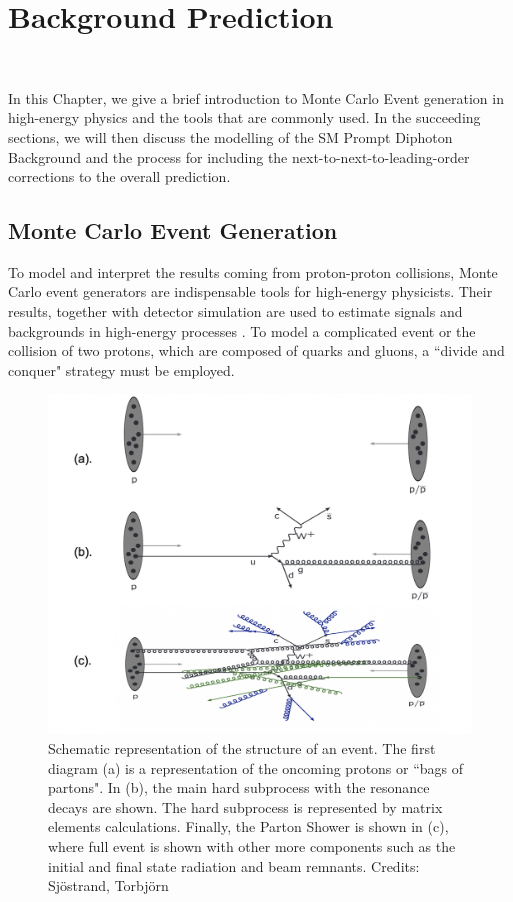\chapter{Background Prediction}~\label{ch:background}


In this Chapter, we give a brief introduction to Monte Carlo Event generation in high-energy physics and the tools that are commonly used. In the succeeding sections, we will then discuss the modelling of the SM Prompt Diphoton Background and the process for including the next-to-next-to-leading-order corrections to the overall prediction. 

\section{Monte Carlo Event Generation}

To model and interpret the results coming from proton-proton collisions, Monte Carlo event generators are indispensable tools for high-energy physicists. Their results, together with detector simulation are used to estimate signals and backgrounds in high-energy processes \cite{Tanabashi:2018oca}. To model a complicated event or the collision of two protons, which are composed of quarks and gluons, a ``divide and conquer" strategy must be employed.  

\begin{figure}[!htb]
	\centering
	\includegraphics[scale=0.5]{fig/eventStructure.png}
	\caption{Schematic representation of the structure of an event. The first diagram (a) is a representation of the oncoming protons or ``bags of partons". In (b), the main hard subprocess with the resonance decays are shown. The hard subprocess is represented by matrix elements calculations. Finally, the Parton Shower is shown in (c), where full event is shown with other more components such as the initial and final state radiation and beam remnants. Credits: Sj{\"o}strand, Torbj{\"o}rn}
	\label{fig:EventStructure}
\end{figure}


